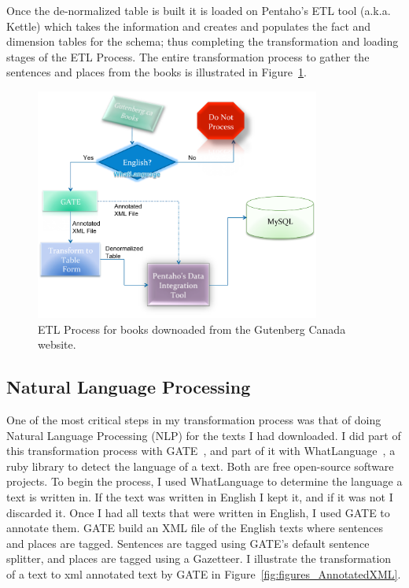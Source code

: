 Once the de-normalized table is built it is loaded on Pentaho's ETL tool (a.k.a. Kettle) which takes the information and creates and populates the fact and
dimension tables for the schema; thus completing the transformation and loading stages of the ETL Process. The entire transformation process to gather the
sentences and places from the books is illustrated in Figure~\ref{fig:figures_BookETLProcess}.

\begin{figure}[htbp]
    \centering
        \includegraphics[height=3in]{figures/BookETLProcess.pdf}
    \caption{ETL Process for books downoaded from the Gutenberg Canada website.}
    \label{fig:figures_BookETLProcess}
\end{figure}

\subsection{Natural Language Processing} %
\label{sub:natural_language_processing}

One of the most critical steps in my transformation process was that of doing Natural Language Processing (NLP) for the texts I had downloaded. I did part of
this transformation process with GATE~\cite{gate-url}, and part of it with WhatLanguage~\cite{whatlanguage-url}, a ruby library to detect the language of a
text. Both are free open-source software projects. To begin the process, I used WhatLanguage to determine the language a text is written in. If the text was
written in English I kept it, and if it was not I discarded it. Once I had all texts that were written in English, I used GATE to annotate them. GATE build an
XML file of the English texts where sentences and places are tagged. Sentences are tagged using GATE’s default sentence splitter, and places are tagged using a
Gazetteer. I illustrate the transformation of a text to xml annotated text by GATE in Figure~\ref{fig:figures_AnnotatedXML}.

